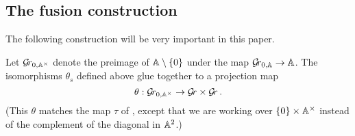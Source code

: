 \documentclass{article} %
\begin{document}



\subsection{The fusion construction}
\label{ss:fuscon}


The following construction will be very important in this paper.  

Let $ \Gr_{0, \AA^\times} $ denote the preimage of $\AA \setminus \{0\}$ under the map $\Gr_{0,\AA} \rightarrow \AA $.  
% 
% 
The isomorphisms $ \theta_s $ defined above glue together to a projection map
\begin{equation}
\label{eq:mvitau}
    \theta : \Gr_{0, \AA^\times} \rightarrow \Gr \times \Gr \, .
\end{equation}
(This $\theta$ matches the map $ \tau $ of \cite{mirkovic2007geometric}, except that we are working over $ \{0 \} \times \AA^\times$ instead of the complement of the diagonal in $ \AA^2 $.)
\end{document}
